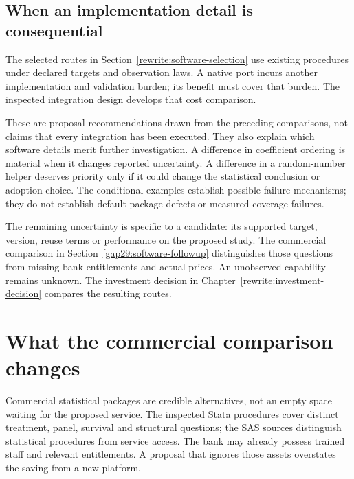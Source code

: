 \subsection{When an implementation detail is consequential}
The selected routes in Section~\ref{rewrite:software-selection} use existing
procedures under declared targets and observation laws. A native port incurs
another implementation and validation burden; its benefit must cover that
burden. The inspected integration design develops that cost comparison.
\citep{exec16_s10_design}

These are proposal recommendations drawn from the preceding comparisons, not
claims that every integration has been executed. They also explain which
software details merit further investigation. A difference in coefficient
ordering is material when it changes reported uncertainty. A difference in a
random-number helper deserves priority only if it could change the statistical
conclusion or adoption choice. The conditional examples establish possible
failure mechanisms; they do not establish default-package defects or measured
coverage failures.~\citep{exec29_panel_inference_sources,exec29_panel_runtime_reference}

The remaining uncertainty is specific to a candidate: its supported target,
version, reuse terms or performance on the proposed study. The commercial
comparison in Section~\ref{gap29:software-followup} distinguishes those
questions from missing bank entitlements and actual prices. An unobserved
capability remains unknown. The investment decision in
Chapter~\ref{rewrite:investment-decision} compares the resulting routes.




\section{What the commercial comparison changes}
Commercial statistical packages are credible alternatives, not an empty space
waiting for the proposed service. The inspected Stata procedures cover distinct
treatment, panel, survival and structural questions; the SAS sources distinguish
statistical procedures from service access. The bank may already possess
trained staff and relevant entitlements. A proposal that ignores those assets
overstates the saving from a new platform.
\citep{exec13_ci_stata_causal_intro,exec18_gp_stata_xthdid,
exec14_survival_stata,exec13_ivrd_sas,exec23_workflow_sasctl}

